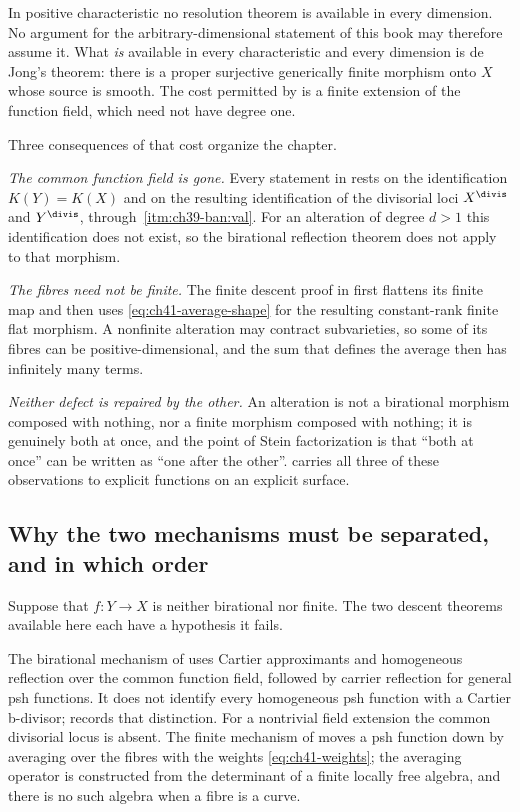 In positive characteristic no resolution theorem is available in every
dimension.  No argument for the arbitrary-dimensional statement of this
book may therefore assume it.  What \emph{is} available in every
characteristic and every dimension is de Jong's theorem: there is a proper
surjective generically finite morphism onto $X$ whose source is smooth.
The cost permitted by  is a finite extension
of the function field, which need not have degree one.

Three consequences of that cost organize the chapter.

\emph{The common function field is gone.}  Every statement in
 rests on the identification
$K(Y)=K(X)$ and on the resulting identification of the divisorial loci
$X^{\divis}$ and $Y^{\divis}$, through
\,\cref{itm:ch39-ban:val}.  For an alteration of
degree $d>1$ this identification does not exist, so the birational reflection theorem does not apply to that morphism.

\emph{The fibres need not be finite.}  The finite descent proof in
 first flattens its finite map and then
uses \eqref{eq:ch41-average-shape} for the resulting constant-rank
finite flat morphism.  A nonfinite alteration may
contract subvarieties, so some of its fibres can be positive-dimensional,
and the sum that defines the average then has infinitely many terms.

\emph{Neither defect is repaired by the other.}  An alteration is not a
birational morphism composed with nothing, nor a finite morphism composed
with nothing; it is genuinely both at once, and the point of Stein
factorization is that ``both at once'' can be written as ``one after the
other''.   carries all three of these
observations to explicit functions on an explicit surface.

\subsection{Why the two mechanisms must be separated, and in which order}
\label{sec:ch42-why-separate}

Suppose that $f:Y\to X$ is neither birational nor finite.
The two descent theorems available here each have a hypothesis it fails.

The birational mechanism of  uses Cartier
approximants and homogeneous reflection over the common function field,
followed by carrier reflection for general psh functions.
It does not identify every homogeneous psh function with a Cartier
b-divisor;  records that distinction.
For a nontrivial field extension the common divisorial locus is absent.
The finite mechanism of
 moves a psh function down by averaging over
the fibres with the weights \eqref{eq:ch41-weights}; the averaging operator
is constructed from the determinant of a finite locally free algebra, and
there is no such algebra when a fibre is a curve.

